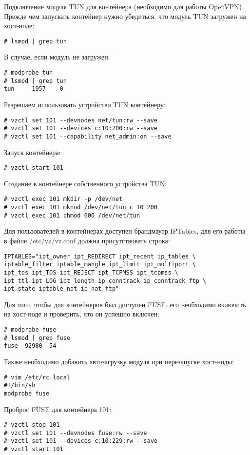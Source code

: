 Подключение модуля TUN для контейнера (необходимо для работы OpenVPN).
Прежде чем запускать контейнер нужно убедиться, что модуль TUN загружен на хост-ноде:
\begin{lstlisting}
# lsmod | grep tun
\end{lstlisting}

В случае, если модуль не загружен:
\begin{lstlisting}
# modprobe tun
# lsmod | grep tun
tun     1957    0
\end{lstlisting}

Разрешаем использовать устройство TUN контейнеру:
\begin{lstlisting}
# vzctl set 101 --devnodes net/tun:rw --save
# vzctl set 101 --devices c:10:200:rw --save
# vzctl set 101 --capability net_admin:on --save
\end{lstlisting}

Запуск контейнера:
\begin{lstlisting}
# vzctl start 101
\end{lstlisting}

Создание в контейнере собственного устройства TUN:
\begin{lstlisting}
# vzctl exec 101 mkdir -p /dev/net
# vzctl exec 101 mknod /dev/net/tun c 10 200
# vzctl exec 101 chmod 600 /dev/net/tun
\end{lstlisting}

Для пользователей в контейнерах доступен брандмауэр IPTables, для его работы в файле /etc/vz/vz.conf должна присутствовать строка:
\begin{lstlisting}
IPTABLES="ipt_owner ipt_REDIRECT ipt_recent ip_tables \
iptable_filter iptable_mangle ipt_limit ipt_multiport \
ipt_tos ipt_TOS ipt_REJECT ipt_TCPMSS ipt_tcpmss \
ipt_ttl ipt_LOG ipt_length ip_conntrack ip_conntrack_ftp \
ipt_state iptable_nat ip_nat_ftp"
\end{lstlisting}

Для того, чтобы для контейнеров был доступен FUSE, его необходимо включить на хост-ноде и проверить, что он успешно включен:
\begin{lstlisting}
# modprobe fuse
# lsmod | grep fuse
fuse  92980  54
\end{lstlisting}

Также необходимо добавить автозагрузку модуля при перезапуске хост-ноды:
\begin{lstlisting}
# vim /etc/rc.local
#!/bin/sh
modprobe fuse
\end{lstlisting}

Проброс FUSE для контейнера 101:
\begin{lstlisting}
# vzctl stop 101
# vzctl set 101 --devnodes fuse:rw --save
# vzctl set 101 --devices c:10:229:rw --save
# vzctl start 101
\end{lstlisting}

